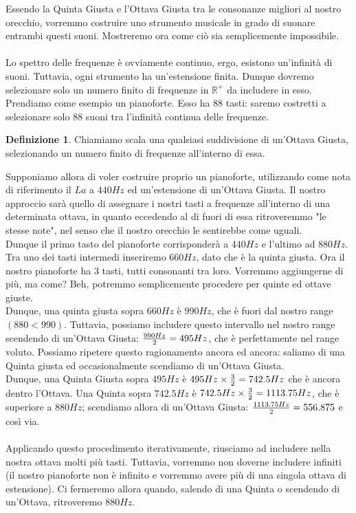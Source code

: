 \documentclass[12pt,a4paper]{report}
\theoremstyle{definition}
\newtheorem{Def}{Definizione}[chapter]
\theoremstyle{Theorem}
\theoremstyle{definition}
\theoremstyle{definition}
\theoremstyle{definition}
\begin{document}
	Essendo la Quinta Giusta e l'Ottava Giusta tra le consonanze migliori al nostro orecchio, vorremmo costruire uno strumento musicale in grado di suonare entrambi questi suoni. Mostreremo ora come ciò sia semplicemente impossibile.\\
	\\
	Lo spettro delle frequenze è ovviamente continuo, ergo, esistono un'infinità di suoni. Tuttavia, ogni strumento ha un'estensione finita. Dunque dovremo selezionare solo un numero finito di frequenze in $\mathbb{R}^+$ da includere in esso. Prendiamo come esempio un pianoforte. Esso ha 88 tasti: saremo costretti a selezionare solo 88 suoni tra l'infinità continua delle frequenze.
	\begin{Def}
		Chiamiamo scala una qualsiasi suddivisione di un'Ottava Giusta, selezionando un numero finito di frequenze all'interno di essa.
	\end{Def}
	Supponiamo allora di voler costruire proprio un pianoforte, utilizzando come nota di riferimento il $La$ a $440 Hz$ ed un'estensione di un'Ottava Giusta. Il nostro approccio sarà quello di assegnare i nostri tasti a frequenze all'interno di una determinata ottava, in quanto eccedendo al di fuori di essa ritroveremmo "le stesse note", nel senso che il nostro orecchio le sentirebbe come uguali.\\
	Dunque il primo tasto del pianoforte corrisponderà a $440 Hz$ e l'ultimo ad $880 Hz$. Tra uno dei tasti intermedi inseriremo $660 Hz$, dato che è la quinta giusta. Ora il nostro pianoforte ha 3 tasti, tutti consonanti tra loro. Vorremmo aggiungerne di più, ma come? Beh, potremmo semplicemente procedere per quinte ed ottave giuste. \\
	Dunque, una quinta giusta sopra $660 Hz$ è $990Hz$, che è fuori dal nostro range $(880<990)$. Tuttavia, possiamo includere questo intervallo nel nostro range scendendo di un'Ottava Giusta: ${990 Hz\over 2}=495 Hz$, che è perfettamente nel range voluto. Possiamo ripetere questo ragionamento ancora ed ancora: saliamo di una Quinta giusta ed occasionalmente scendiamo di un'Ottava Giusta. \\
	Dunque, una Quinta Giusta sopra $495 Hz$ è $495Hz \times {3\over 2}=742.5Hz$ che è ancora dentro l'Ottava. Una Quinta sopra $742.5 Hz$ è $742.5 Hz\times {3\over 2}=1113.75 Hz$, che è superiore a $880 Hz$; scendiamo allora di un'Ottava Giusta: ${1113.75 Hz\over 2}=556.875$ e così via.\\
	\\
	Applicando questo procedimento iterativamente, riusciamo ad includere nella nostra ottava molti più tasti. Tuttavia, vorremmo non doverne includere infiniti (il nostro pianoforte non è infinito e vorremmo avere più di una singola ottava di estensione). Ci fermeremo allora quando, salendo di una Quinta o scendendo di un'Ottava, ritroveremo $880Hz$.\\
\end{document}
